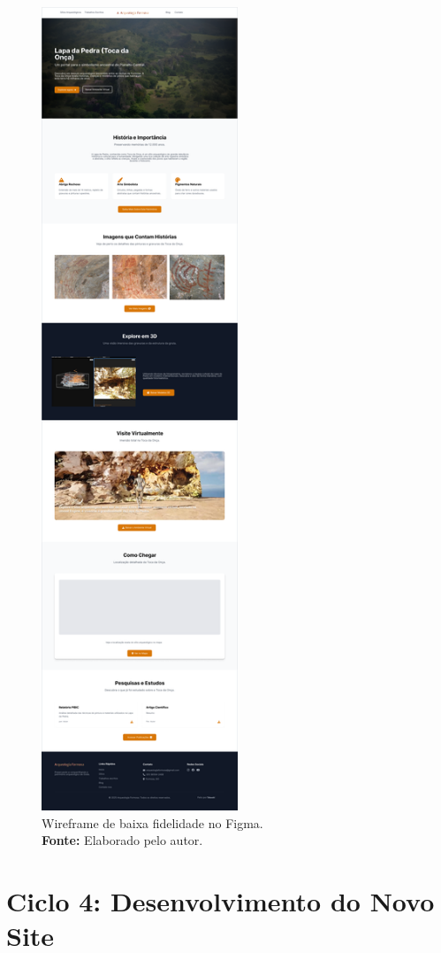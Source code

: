 \begin{figure}[H]
\begin{minipage}[b]{0.48\textwidth}
        \includegraphics[height=24cm, keepaspectratio]{img/Protótipo/prototipo alta fidelidade toca da onça.png}
        \caption{Wireframe de baixa fidelidade no Figma. \\
            \textbf{Fonte:} Elaborado pelo autor.}
        \label{fig:wireframe}
    \end{minipage}
\end{figure}

\section{Ciclo 4: Desenvolvimento do Novo Site}
\label{sec:ciclo4_desenvolvimento}

